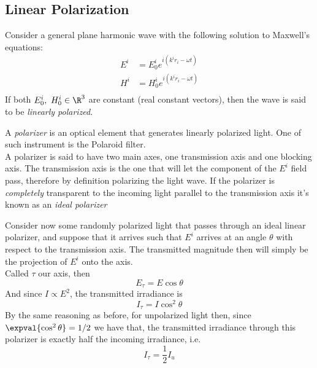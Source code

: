 \documentclass[../electromagnetism.tex]{subfiles}
\begin{document}
\subsection{Linear Polarization}
\begin{dfn}
	Consider a general plane harmonic wave with the following solution to Maxwell's equations:
	\begin{equation*}
		\begin{aligned}
			E^i&=E_0^ie^{i\left( k^ir_i-\omega t \right)}\\
			H^i&=H_0^ie^{i\left( k^ir_i-\omega t \right)}\\
		\end{aligned}
	\end{equation*}
	If both $E_0^i,\ H_0^i\in\R^3$ are constant (real constant vectors), then the wave is said to be \textit{linearly polarized}.
\end{dfn}
\begin{dfn}[Polarizer]
	A \textit{polarizer} is an optical element that generates linearly polarized light. One of such instrument is the Polaroid filter.\\
	A polarizer is said to have two main axes, one transmission axis and one blocking axis. The transmission axis is the one that will let the component of the $E^i$ field pass, therefore by definition polarizing the light wave. If the polarizer is \emph{completely} transparent to the incoming light parallel to the transmission axis it's known as an \textit{ideal polarizer}
\end{dfn}
Consider now some randomly polarized light that passes through an ideal linear polarizer, and suppose that it arrives such that $E^i$ arrives at an angle $\theta$ with respect to the transmission axis. The transmitted magnitude then will simply be the projection of $E^i$ onto the axis.\\
Called $\tau$ our axis, then
\begin{equation*}
	E_\tau=E\cos\theta
\end{equation*}
And since $I\propto E^2$, the transmitted irradiance is
\begin{equation*}
	I_\tau=I\cos^2\theta
\end{equation*}
By the same reasoning as before, for unpolarized light then, since $\expval{\cos^2\theta}=1/2$ we have that, the transmitted irradiance through this polarizer is exactly half the incoming irradiance, i.e.
\begin{equation*}
	I_\tau=\frac{1}{2}I_u
\end{equation*}
\end{document}
